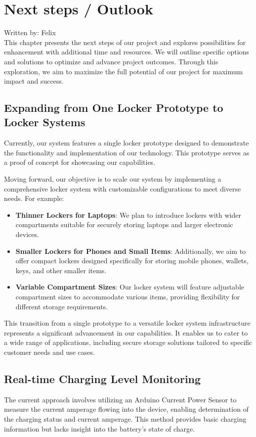 \section{Next steps / Outlook}
{\tiny Written by: Felix}\\ 


This chapter presents the next steps of our project and explores possibilities 
for enhancement with additional time and resources. 
We will outline specific options and solutions to optimize and advance project outcomes. 
Through this exploration, we aim to maximize the full potential of our project 
for maximum impact and success.

\subsection{Expanding from One Locker Prototype to Locker Systems}

Currently, our system features a single locker prototype designed to demonstrate the functionality and implementation of our technology. This prototype serves as a proof of concept for showcasing our capabilities.

Moving forward, our objective is to scale our system by implementing a comprehensive locker system with customizable configurations to meet diverse needs. For example:

\begin{itemize}
    \item \textbf{Thinner Lockers for Laptops}: We plan to introduce lockers with wider compartments suitable for securely storing laptops and larger electronic devices.
    \item \textbf{Smaller Lockers for Phones and Small Items}: Additionally, we aim to offer compact lockers designed specifically for storing mobile phones, wallets, keys, and other smaller items.
    \item \textbf{Variable Compartment Sizes}: Our locker system will feature adjustable compartment sizes to accommodate various items, providing flexibility for different storage requirements.
\end{itemize}

This transition from a single prototype to a versatile locker system infrastructure represents a significant advancement in our capabilities. It enables us to cater to a wide range of applications, including secure storage solutions tailored to specific customer needs and use cases.


\subsection{Real-time Charging Level Monitoring}
The current approach involves utilizing an Arduino Current Power Sensor to measure the
current amperage flowing into the device, 
enabling determination of the charging status and current amperage. 
This method provides basic charging information but lacks insight into the battery's state of charge.

